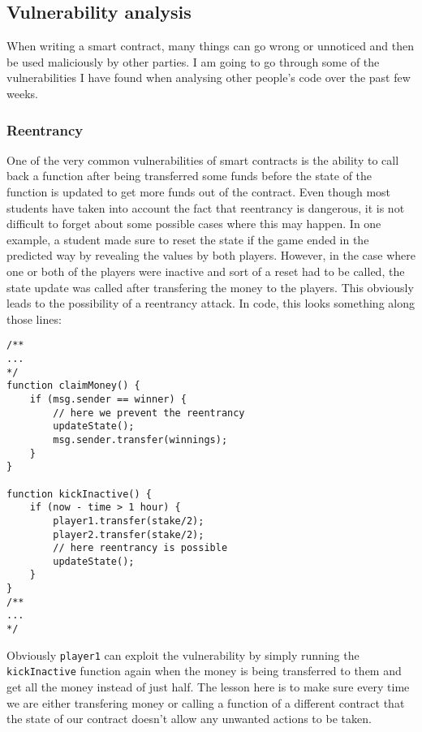 \documentclass{article}
\begin{document}
    \subsection{Vulnerability analysis}
    When writing a smart contract, many things can go wrong
    or unnoticed and then be used maliciously by other
    parties. I am going to go through some of the
    vulnerabilities I have found when analysing other
    people's code over the past few weeks.

    \subsubsection{Reentrancy}
    One of the very common vulnerabilities of smart
    contracts is the ability to call back a function after
    being transferred some funds before the state of the
    function is updated to get more funds out of the
    contract. Even though most students have taken into
    account the fact that reentrancy is dangerous, it is not
    difficult to forget about some possible cases where this
    may happen. In one example, a student made sure to reset
    the state if the game ended in the predicted way by
    revealing the values by both players. However, in the
    case where one or both of the players were inactive and
    sort of a reset had to be called, the state update was
    called after transfering the money to the players. This
    obviously leads to the possibility of a reentrancy
    attack. In code, this looks something along those lines:

    \begin{lstlisting}[language=Solidity]
/**
...
*/
function claimMoney() {
    if (msg.sender == winner) {
        // here we prevent the reentrancy
        updateState();
        msg.sender.transfer(winnings);
    }
}

function kickInactive() {
    if (now - time > 1 hour) {
        player1.transfer(stake/2);
        player2.transfer(stake/2);
        // here reentrancy is possible
        updateState();
    }
}
/**
...
*/
    \end{lstlisting}

    \noindent Obviously \verb|player1| can exploit the
    vulnerability by simply running the \verb|kickInactive|
    function again when the money is being transferred to
    them and get all the money instead of just half. The
    lesson here is to make sure every time we are either
    transfering money or calling a function of a different
    contract that the state of our contract doesn't allow
    any unwanted actions to be taken.
\end{document}
